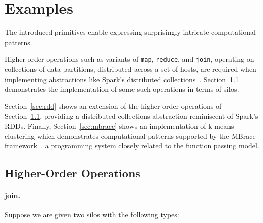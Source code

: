 \documentclass{jfp1}
\begin{document}
\section{Examples}
\label{sec:higher-order-operations}

The introduced primitives enable expressing surprisingly intricate computational
patterns.

Higher-order operations such as variants of \verb|map|, \verb|reduce|, and
\verb|join|, operating on collections of data partitions, distributed across a
set of hosts, are required when implementing abstractions like Spark's
distributed collections~\cite{Spark}. Section~\ref{sec:dist-coll} demonstrates
the implementation of some such operations in terms of silos.

Section~\ref{sec:rdd} shows an extension of the higher-order
operations of Section~\ref{sec:dist-coll}, providing a distributed
collections abstraction reminiscent of Spark's RDDs. Finally,
Section~\ref{sec:mbrace} shows an implementation of k-means clustering
which demonstrates computational patterns supported by the MBrace
framework~\cite{MBrace}, a programming system closely related to the
function passing model.



\subsection{Higher-Order Operations}
\label{sec:dist-coll}

%

\paragraph{join.}

Suppose we are given two silos with the following types:
\end{document}

